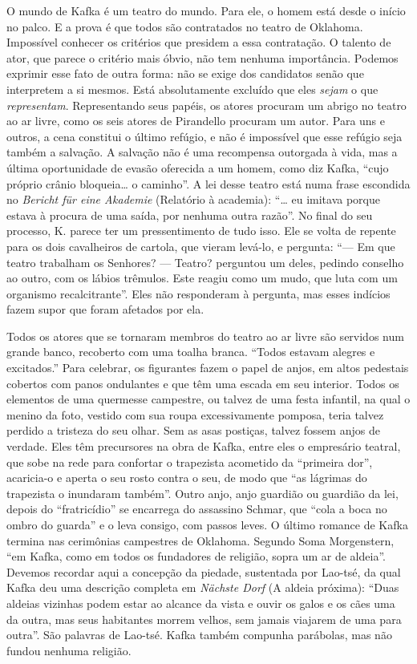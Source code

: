 O mundo de Kafka é um teatro do mundo. Para ele, o homem está desde o
início no palco. E a prova é que todos são contratados no teatro de
Oklahoma. Impossível conhecer os critérios que presidem a essa
contratação. O talento de ator, que parece o critério mais óbvio, não
tem nenhuma importância. Podemos exprimir esse fato de outra forma: não
se exige dos candidatos senão que interpretem a si mesmos. Está
absolutamente excluído que eles \textit{sejam} o que \textit{representam}.
Representando seus papéis, os atores procuram um abrigo no teatro ao ar
livre, como os seis atores de Pirandello procuram um autor. Para uns e
outros, a cena constitui o último refúgio, e não é impossível que esse
refúgio seja também a salvação. A salvação não é uma recompensa
outorgada à vida, mas a última oportunidade de evasão oferecida a um
homem, como diz Kafka, ``cujo próprio crânio bloqueia\ldots{} o caminho''. A
lei desse teatro está numa frase escondida no \textit{Bericht für eine
Akademie} (Relatório à academia): ``\ldots{} eu imitava porque estava à
procura de uma saída, por nenhuma outra razão''. No final do seu
processo, K. parece ter um pressentimento de tudo isso. Ele se volta de
repente para os dois cavalheiros de cartola, que vieram levá-lo, e
pergunta: ``--- Em que teatro trabalham os Senhores? --- Teatro?
perguntou um deles, pedindo conselho ao outro, com os lábios trêmulos.
Este reagiu como um mudo, que luta com um organismo recalcitrante''.
Eles não responderam à pergunta, mas esses indícios fazem supor que
foram afetados por ela.

Todos os atores que se tornaram membros do teatro ao ar livre são
servidos num grande banco, recoberto com uma toalha branca. ``Todos
estavam alegres e excitados.'' Para celebrar, os figurantes fazem o
papel de anjos, em altos pedestais cobertos com panos ondulantes e que
têm uma escada em seu interior. Todos os elementos de uma quermesse
campestre, ou talvez de uma festa infantil, na qual o menino da foto,
vestido com sua roupa excessivamente pomposa, teria talvez perdido a
tristeza do seu olhar. Sem as asas postiças, talvez fossem anjos de
verdade. Eles têm precursores na obra de Kafka, entre eles o empresário
teatral, que sobe na rede para confortar o trapezista acometido da
``primeira dor'', acaricia-o e aperta o seu rosto contra o seu, de modo
que ``as lágrimas do trapezista o inundaram também''. Outro anjo, anjo
guardião ou guardião da lei, depois do ``fratricídio'' se encarrega do
assassino Schmar, que ``cola a boca no ombro do guarda'' e o leva
consigo, com passos leves. O último romance de Kafka termina nas
cerimônias campestres de Oklahoma. Segundo Soma Morgenstern, ``em Kafka,
como em todos os fundadores de religião, sopra um ar de aldeia''.
Devemos recordar aqui a concepção da piedade, sustentada por Lao-tsé, da
qual Kafka deu uma descrição completa em \textit{Nächste Dorf} (A aldeia
próxima): ``Duas aldeias vizinhas podem estar ao alcance da vista e
ouvir os galos e os cães uma da outra, mas seus habitantes morrem
velhos, sem jamais viajarem de uma para outra''. São palavras de
Lao-tsé. Kafka também compunha parábolas, mas não fundou nenhuma
religião.


